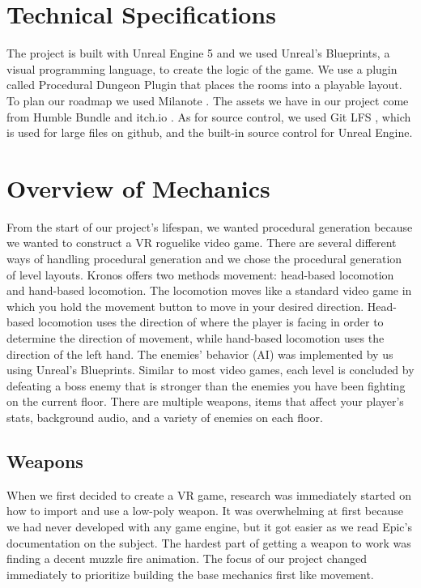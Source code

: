\documentclass{sigchi}
\begin{document}
\section{Technical Specifications}
The project is built with Unreal Engine 5 \cite{unrealweb} and we used Unreal's Blueprints, a visual programming language, to create the logic of the game. We use a plugin called Procedural Dungeon Plugin \cite{dungeonplugin} that places the rooms into a playable layout. To plan our roadmap we used Milanote \cite{milanote}. The assets we have in our project come from Humble Bundle \cite{humble} and itch.io \cite{itch}. As for source control, we used Git LFS \cite{gitlfs}, which is used for large files on github, and the built-in source control for Unreal Engine.

\section{Overview of Mechanics}
From the start of our project's lifespan, we wanted procedural generation because we wanted to construct a VR roguelike video game.  There are several different ways of handling procedural generation and we chose the procedural generation of level layouts.  Kronos offers two methods movement: head-based locomotion and hand-based locomotion. The locomotion moves like a standard video game in which you hold the movement button to move in your desired direction. Head-based locomotion uses the direction of where the player is facing in order to determine the direction of movement, while hand-based locomotion uses the direction of the left hand. The enemies' behavior (AI) was implemented by us using Unreal's Blueprints. Similar to most video games, each level is concluded by defeating a boss enemy that is stronger than the enemies you have been fighting on the current floor. There are multiple weapons, items that affect your player's stats,  background audio, and a variety of enemies on each floor.

\subsection*{Weapons}
When we first decided to create a VR game, research was immediately started on how to import and use a low-poly weapon. It was overwhelming at first because we had never developed with any game engine, but it got easier as we read Epic's documentation on the subject. The hardest part of getting a weapon to work was finding a decent muzzle fire animation. The focus of our project changed immediately to prioritize building the base mechanics first like movement.
\end{document}
